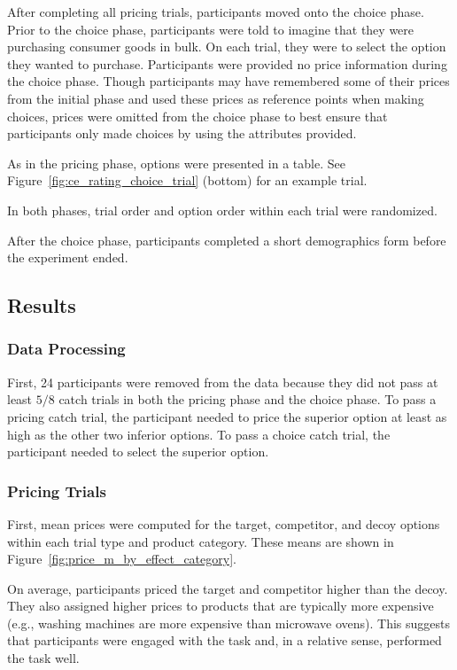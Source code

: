 After completing all pricing trials, participants moved onto the choice phase. Prior to the choice phase, participants were told to imagine that they were purchasing consumer goods in bulk. On each trial, they were to select the option they wanted to purchase. Participants were provided no price information during the choice phase. Though participants may have remembered some of their prices from the initial phase and used these prices as reference points when making choices, prices were omitted from the choice phase to best ensure that participants only made choices by using the attributes provided.

As in the pricing phase, options were presented in a table. See Figure~\ref{fig:ce_rating_choice_trial} (bottom) for an example trial.

In both phases, trial order and option order within each trial were randomized. 

After the choice phase, participants completed a short demographics form before the experiment ended. 

\subsection{Results}

\subsubsection{Data Processing}

First, 24 participants were removed from the data because they did not pass at least $5/8$ catch trials in both the pricing phase and the choice phase. To pass a pricing catch trial, the participant needed to price the superior option at least as high as the other two inferior options. To pass a choice catch trial, the participant needed to select the superior option. 

\subsubsection{Pricing Trials}

First, mean prices were computed for the target, competitor, and decoy options within each trial type and product category. These means are shown in Figure~\ref{fig:price_m_by_effect_category}.

On average, participants priced the target and competitor higher than the decoy. They also assigned higher prices to products that are typically more expensive (e.g., washing machines are more expensive than microwave ovens). This suggests that participants were engaged with the task and, in a relative sense, performed the task well.

